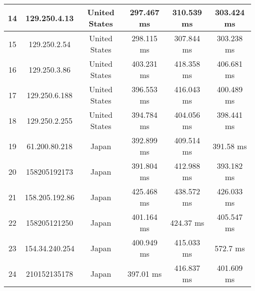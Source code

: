 \begin{table}[H]
\begin{tabular}{ | c | c | c | c | c | c | }
14	&129.250.4.13    &    	   United States &   	     297.467 ms    & 	     310.539 ms     &	     303.424 ms  \\ \hline    
15	&129.250.2.54    &    	   United States &   	     298.115 ms    & 	     307.844 ms     &	     303.238 ms  \\ \hline    
16	&129.250.3.86    &    	   United States &   	     403.231 ms    & 	     418.358 ms     &	     406.681 ms  \\ \hline    
17	&129.250.6.188   &    	   United States &   	     396.553 ms    & 	     416.043 ms     &	     400.489 ms  \\ \hline    
18	&129.250.2.255   &    	   United States &   	     394.784 ms    & 	     404.056 ms     &	     398.441 ms  \\ \hline    
19	&61.200.80.218   &    	       Japan     &   	     392.899 ms    & 	     409.514 ms     &	      391.58 ms  \\ \hline    
20	&158205192173	 &      Japan        	  &   391.804 ms     	    & 412.988 ms     	     &393.182 ms     \\ \hline    
21	&158.205.192.86  &    	       Japan     &   	     425.468 ms    & 	     438.572 ms     &	     426.033 ms  \\ \hline     
22	&158205121250	 &      Japan        	  &   401.164 ms     	    &  424.37 ms     	     &405.547 ms     \\ \hline    
23	&154.34.240.254  &    	       Japan     &   	     400.949 ms    & 	     415.033 ms     &	       572.7 ms  \\ \hline    
24	&210152135178	 &      Japan        	  &    397.01 ms     	    & 416.837 ms     	     &401.609 ms         \\ \hline

\end{tabular}
\end{table}
% 
